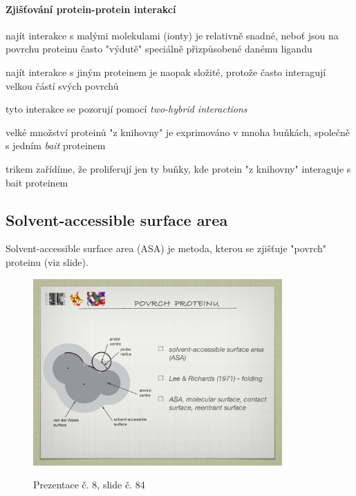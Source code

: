 \documentclass[DIV=8]{scrreprt}
\begin{document}
\paragraph{Zjišťování protein-protein interakcí}
\begin{myItemize}[nosep]
    \item najít interakce s malými molekulami (ionty) je relativně snadné, neboť jsou na povrchu proteinu často "výdutě" speciálně přizpůsobené danému ligandu
    \item najít interakce s jiným proteinem je naopak složité, protože často interagují velkou částí svých povrchů
    \item tyto interakce se pozorují pomocí \emph{two-hybrid interactions}
\begin{myItemize}[nosep]
    \item velké množství proteinů "z knihovny" je exprimováno v mnoha buňkách, společně s jedním \emph{bait} proteinem
    \item trikem zařídíme, že proliferují jen ty buňky, kde protein "z knihovny" interaguje s bait proteinem
\end{myItemize}

\end{myItemize}



\subsection{Solvent-accessible surface area} \label{Solvent-accessible surface area}


Solvent-accessible surface area (ASA) je metoda, kterou se zjišťuje "povrch" proteinu (viz slide). \begin{figure}
    \caption{Prezentace č. 8, slide č. 84}
    \includegraphics[width=0.85\textwidth]{slides-8/slide-84.jpg}
    \centering
    \label{slides-8-slide-84}
\end{figure}
\end{document}
